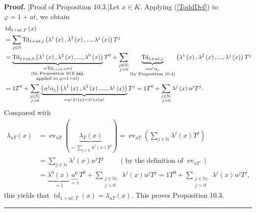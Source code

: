 \documentclass[numbers=enddot,12pt,final,onecolumn,notitlepage]{scrartcl}%
\newenvironment{proof}[1][Proof]{\noindent\textbf{#1.} }{\ \rule{0.5em}{0.5em}}
\begin{document}
\begin{proof}
[Proof of Proposition 10.3.]Let $x\in K$. Applying (\ref{ToddDef}) to
$\varphi=1+ut$, we obtain%
\begin{align*}
&  \operatorname*{td}\nolimits_{1+ut,T}\left(  x\right) \\
&  =\sum_{j\in\mathbb{N}}\operatorname*{Td}\nolimits_{1+ut,j}\left(
\lambda^{1}\left(  x\right)  ,\lambda^{2}\left(  x\right)  ,...,\lambda
^{j}\left(  x\right)  \right)  T^{j}\\
&  =\underbrace{\operatorname*{Td}\nolimits_{1+ut,0}\left(  \lambda^{1}\left(
x\right)  ,\lambda^{2}\left(  x\right)  ,...,\lambda^{0}\left(  x\right)
\right)  }_{\substack{=\operatorname*{Td}\nolimits_{1+ut,0}=1\\\text{(by
Proposition 10.6 \textbf{(a)},}\\\text{applied to }\varphi=1+ut\text{)}}%
}T^{0}+\sum_{\substack{j\in\mathbb{N};\\j>0}}\underbrace{\operatorname*{Td}%
\nolimits_{1+ut,j}}_{\substack{=u^{j}\alpha_{j}\\\text{(by Proposition 10.4)}%
}}\left(  \lambda^{1}\left(  x\right)  ,\lambda^{2}\left(  x\right)
,...,\lambda^{j}\left(  x\right)  \right)  T^{j}\\
&  =1T^{0}+\sum_{\substack{j\in\mathbb{N};\\j>0}}\underbrace{\left(
u^{j}\alpha_{j}\right)  \left(  \lambda^{1}\left(  x\right)  ,\lambda
^{2}\left(  x\right)  ,...,\lambda^{j}\left(  x\right)  \right)  }%
_{=u^{j}\lambda^{j}\left(  x\right)  =\lambda^{j}\left(  x\right)  u^{j}}%
T^{j}=1T^{0}+\sum_{\substack{j\in\mathbb{N};\\j>0}}\lambda^{j}\left(
x\right)  u^{j}T^{j}.
\end{align*}
Compared with%
\begin{align*}
\lambda_{uT}\left(  x\right)   &  =\operatorname*{ev}\nolimits_{uT}\left(
\underbrace{\lambda_{T}\left(  x\right)  }_{=\sum\limits_{j\in\mathbb{N}%
}\lambda^{j}\left(  x\right)  T^{j}}\right)  =\operatorname*{ev}%
\nolimits_{uT}\left(  \sum\limits_{j\in\mathbb{N}}\lambda^{j}\left(  x\right)
T^{j}\right) \\
&  =\sum\limits_{j\in\mathbb{N}}\lambda^{j}\left(  x\right)  u^{j}%
T^{j}\ \ \ \ \ \ \ \ \ \ \left(  \text{by the definition of }%
\operatorname*{ev}\nolimits_{uT}\right) \\
&  =\underbrace{\lambda^{0}\left(  x\right)  }_{=1}\underbrace{u^{0}}%
_{=1}T^{0}+\sum_{\substack{j\in\mathbb{N};\\j>0}}\lambda^{j}\left(  x\right)
u^{j}T^{j}=1T^{0}+\sum_{\substack{j\in\mathbb{N};\\j>0}}\lambda^{j}\left(
x\right)  u^{j}T^{j},
\end{align*}
this yields that $\operatorname*{td}\nolimits_{1+ut,T}\left(  x\right)
=\lambda_{uT}\left(  x\right)  $. This proves Proposition 10.3.
\end{proof}
\end{document}

